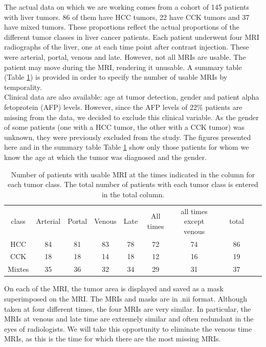 \documentclass[preprint,12pt]{elsarticle}
\begin{document}
\noindent The actual data on which we are working comes from a cohort of 145 patients with liver tumors. 86 of them have HCC tumors, 22 have CCK tumors and 37 have mixed tumors. These proportions reflect the actual proportions of the different tumor classes in liver cancer patients. Each patient underwent four MRI radiographs of the liver, one at each time point after contrast injection. These were arterial, portal, venous and late. However, not all MRIs are usable. The patient may move during the MRI, rendering it unusable. A summary table (Table \ref{tab:nb_tumeurs}) is provided in order to specify the number of usable MRIs by temporality.\\
\indent Clinical data are also available: age at tumor detection, gender and patient alpha fetoprotein (AFP) levels. However, since the AFP levels of $22\%$ patients are missing from the data, we decided to exclude this clinical variable. As the gender of some patients (one with a HCC tumor, the other with a CCK tumor) was unknown, they were previously excluded from the study. The figures presented here and in the summary table Table \ref{tab:nb_tumeurs} show only those patients for whom we know the age at which the tumor was diagnosed and the gender.\\
\begin{table}[tbp]
    \centering
    \caption{Number of patients with usable MRI at the times indicated in the column for each tumor class. The total number of patients with each tumor class is entered in the total column.}
    \label{tab:nb_tumeurs}
    \begin{tabular}{|c|c|c|c|c|c|c|c|c|c|c|}
        \cline{1-7} \cline{9-9}
        class & Arterial & Portal & Venous & Late & All times & all times except venous& & total \\
        \cline{1-7} \cline{9-9}
        HCC & 84 & 81 & 83 & 78 & 72 & 74 & & 86\\
        \cline{1-7} \cline{9-9}
        CCK & 18 & 18 & 14 & 18 & 12 & 16 & & 19\\
        \cline{1-7} \cline{9-9}
        Mixtes & 35 & 36 & 32 & 34 & 29 & 31 & & 37\\
        \cline{1-7} \cline{9-9}
    \end{tabular}
\end{table}
\indent On each of the MRI, the tumor area is displayed and saved as a mask superimposed on the MRI. The MRIs and masks are in .nii format. Although taken at four different times, the four MRIs are very similar. In particular, the MRIs at venous and late time are extremely similar and often redundant in the eyes of radiologists. We will take this opportunity to eliminate the venous time MRIs, as this is the time for which there are the most missing MRIs.
\end{document}
